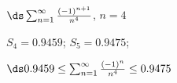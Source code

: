 {$\ds \sum_{n=1}^\infty \frac{(-1)^{n+1}}{n^4}$, \quad $n=4$
}
{$S_4 = 0.9459$; $S_5 = 0.9475$;

$\ds 0.9459 \leq \sum_{n=1}^\infty \frac{(-1)^n}{n^4} \leq 0.9475$
}